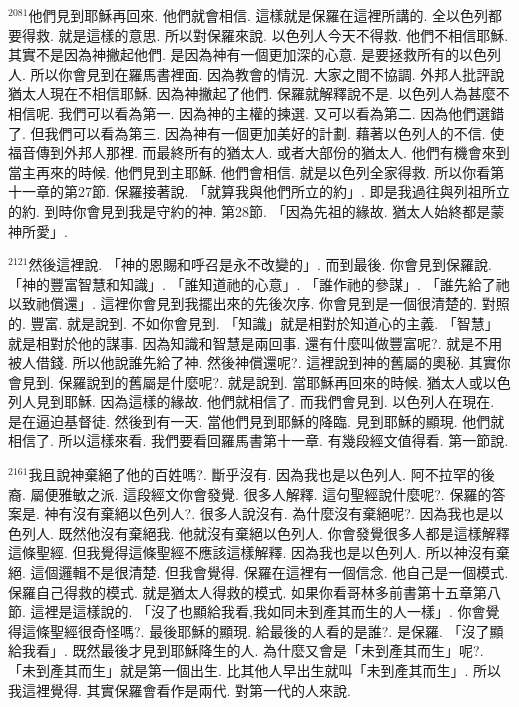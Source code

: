 \documentclass{book}
\begin{document}
$^{2081}$他們見到耶穌再回來.
他們就會相信.
這樣就是保羅在這裡所講的.
全以色列都要得救.
就是這樣的意思.
所以對保羅來說.
以色列人今天不得救.
他們不相信耶穌.
其實不是因為神撇起他們.
是因為神有一個更加深的心意.
是要拯救所有的以色列人.
所以你會見到在羅馬書裡面.
因為教會的情況.
大家之間不協調.
外邦人批評說猶太人現在不相信耶穌.
因為神撇起了他們.
保羅就解釋說不是.
以色列人為甚麼不相信呢.
我們可以看為第一.
因為神的主權的揀選.
又可以看為第二.
因為他們選錯了.
但我們可以看為第三.
因為神有一個更加美好的計劃.
藉著以色列人的不信.
使福音傳到外邦人那裡.
而最終所有的猶太人.
或者大部份的猶太人.
他們有機會來到當主再來的時候.
他們見到主耶穌.
他們會相信.
就是以色列全家得救.
所以你看第十一章的第27節.
保羅接著說.
「就算我與他們所立的約」.
即是我過往與列祖所立的約.
到時你會見到我是守約的神.
第28節.
「因為先祖的緣故.
猶太人始終都是蒙神所愛」.

$^{2121}$然後這裡說.
「神的恩賜和呼召是永不改變的」.
而到最後.
你會見到保羅說.
「神的豐富智慧和知識」.
「誰知道祂的心意」.
「誰作祂的參謀」.
「誰先給了祂 以致祂償還」.
這裡你會見到我擺出來的先後次序.
你會見到是一個很清楚的.
對照的.
豐富.
就是說到.
不如你會見到.
「知識」就是相對於知道心的主義.
「智慧」就是相對於他的謀事.
因為知識和智慧是兩回事.
還有什麼叫做豐富呢?.
就是不用被人借錢.
所以他說誰先給了神.
然後神償還呢?.
這裡說到神的舊屬的奧秘.
其實你會見到.
保羅說到的舊屬是什麼呢?.
就是說到.
當耶穌再回來的時候.
猶太人或以色列人見到耶穌.
因為這樣的緣故.
他們就相信了.
而我們會見到.
以色列人在現在.
是在逼迫基督徒.
然後到有一天.
當他們見到耶穌的降臨.
見到耶穌的顯現.
他們就相信了.
所以這樣來看.
我們要看回羅馬書第十一章.
有幾段經文值得看.
第一節說.

$^{2161}$我且說神棄絕了他的百姓嗎?.
斷乎沒有.
因為我也是以色列人.
阿不拉罕的後裔.
屬便雅敏之派.
這段經文你會發覺.
很多人解釋.
這句聖經說什麼呢?.
保羅的答案是.
神有沒有棄絕以色列人?.
很多人說沒有.
為什麼沒有棄絕呢?.
因為我也是以色列人.
既然他沒有棄絕我.
他就沒有棄絕以色列人.
你會發覺很多人都是這樣解釋這條聖經.
但我覺得這條聖經不應該這樣解釋.
因為我也是以色列人.
所以神沒有棄絕.
這個邏輯不是很清楚.
但我會覺得.
保羅在這裡有一個信念.
他自己是一個模式.
保羅自己得救的模式.
就是猶太人得救的模式.
如果你看哥林多前書第十五章第八節.
這裡是這樣說的.
「沒了也顯給我看,我如同未到產其而生的人一樣」.
你會覺得這條聖經很奇怪嗎?.
最後耶穌的顯現.
給最後的人看的是誰?.
是保羅.
「沒了顯給我看」.
既然最後才見到耶穌降生的人.
為什麼又會是「未到產其而生」呢?.
「未到產其而生」就是第一個出生.
比其他人早出生就叫「未到產其而生」.
所以我這裡覺得.
其實保羅會看作是兩代.
對第一代的人來說.
\end{document}
